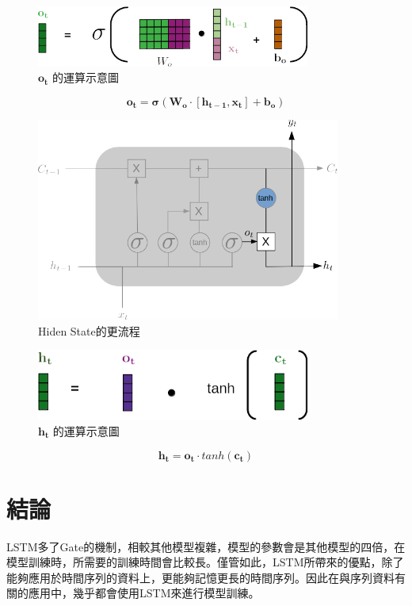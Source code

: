 \begin{figure}[H]
	\centering
	\includegraphics[width=9cm]{./pic/bcjXoMZk.png}
	\caption{\(\mathbf{o_t}\) 的運算示意圖}
	\label{fig:OutputGateCalculate}
\end{figure}

\begin{equation}
	\label{eqn:OutputGateCalculate}
	\mathbf{o_t = \sigma(W_o\cdot[h_{t-1},x_t]+b_o)}
\end{equation}

\begin{figure}[H]
	\centering
	\includegraphics[width=10cm]{./pic/evwQIqAz.png}
	\caption{Hiden State的更流程}
	\label{fig:HidenStateUpdate}
\end{figure}


\begin{figure}[H]
	\centering
	\includegraphics[width=9cm]{./pic/vo6a2bAS.png}
	\caption{\(\mathbf{h_t}\) 的運算示意圖}
	\label{fig:HidenStateUpdateCaculate}
\end{figure}


\begin{equation}
	\label{eqn:InputCalculate}
	\mathbf{h_t} = \mathbf{o_t} \cdot tanh(\mathbf{c_t}) 
\end{equation}



\section {結論}

LSTM多了Gate的機制，相較其他模型複雜，模型的參數會是其他模型的四倍，在模型訓練時，所需要的訓練時間會比較長。僅管如此，LSTM所帶來的優點，除了能夠應用於時間序列的資料上，更能夠記憶更長的時間序列。因此在與序列資料有關的應用中，幾乎都會使用LSTM來進行模型訓練。




